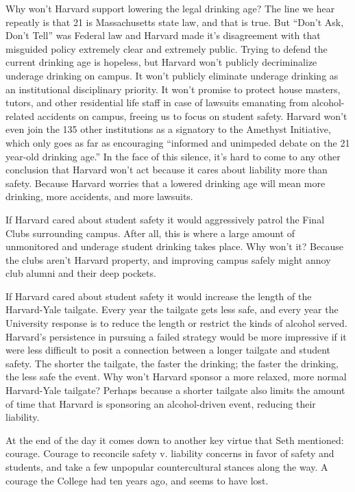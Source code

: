 Why won't Harvard support lowering the legal drinking age? The line we hear
repeatly is that 21 is Massachusetts state law, and that is true. But ``Don't
Ask, Don't Tell'' was Federal law and Harvard made it's disagreement with
that misguided policy extremely clear and extremely public. Trying to defend
the current drinking age is hopeless, but Harvard won't publicly
decriminalize underage drinking on campus. It won't publicly eliminate
underage drinking as an institutional disciplinary priority. It won't promise
to protect house masters, tutors, and other residential life staff in case of
lawsuits emanating from alcohol-related accidents on campus, freeing us to
focus on student safety. Harvard won't even join the 135 other institutions
as a signatory to the Amethyst Initiative, which only goes as far as
encouraging ``informed and unimpeded debate on the 21 year-old drinking
age.'' In the face of this silence, it's hard to come to any other conclusion
that Harvard won't act because it cares about liability more than safety.
Because Harvard worries that a lowered drinking age will mean more drinking,
more accidents, and more lawsuits.

If Harvard cared about student safety it would aggressively patrol the Final
Clubs surrounding campus. After all, this is where a large amount of
unmonitored and underage student drinking takes place. Why won't it? Because
the clubs aren't Harvard property, and improving campus safely might annoy
club alumni and their deep pockets.

If Harvard cared about student safety it would increase the length of the
Harvard-Yale tailgate. Every year the tailgate gets less safe, and every year
the University response is to reduce the length or restrict the kinds of
alcohol served. Harvard's persistence in pursuing a failed strategy would be
more impressive if it were less difficult to posit a connection between a
longer tailgate and student safety. The shorter the tailgate, the faster the
drinking; the faster the drinking, the less safe the event. Why won't Harvard
sponsor a more relaxed, more normal Harvard-Yale tailgate? Perhaps because a
shorter tailgate also limits the amount of time that Harvard is sponsoring an
alcohol-driven event, reducing their liability.

At the end of the day it comes down to another key virtue that Seth
mentioned: courage. Courage to reconcile safety v. liability concerns in
favor of safety and students, and take a few unpopular countercultural
stances along the way. A courage the College had ten years ago, and seems to
have lost.

